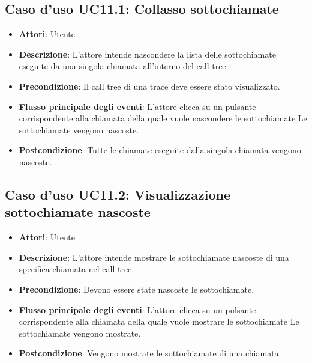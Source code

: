 \subsection{Caso d'uso UC11.1: Collasso sottochiamate}
\begin{itemize}
	\item \textbf{Attori}: Utente
	\item \textbf{Descrizione}: L'attore intende nascondere la lista delle sottochiamate eseguite da una singola chiamata all'interno del call tree.
	\item \textbf{Precondizione}: Il call tree di una trace deve essere stato visualizzato.
	\item \textbf{Flusso principale degli eventi}: L'attore clicca su un pulsante corrispondente alla chiamata della quale vuole nascondere le sottochiamate Le sottochiamate vengono nascoste.
	\item \textbf{Postcondizione}: Tutte le chiamate eseguite dalla singola chiamata vengono nascoste.
\end{itemize}
\subsection{Caso d'uso UC11.2: Visualizzazione sottochiamate nascoste}
\begin{itemize}
	\item \textbf{Attori}: Utente
	\item \textbf{Descrizione}: L'attore intende mostrare le sottochiamate nascoste di una specifica chiamata nel call tree.
	\item \textbf{Precondizione}: Devono essere state nascoste le sottochiamate.
	\item \textbf{Flusso principale degli eventi}: L'attore clicca su un pulsante corrispondente alla chiamata della quale vuole mostrare le sottochiamate Le sottochiamate vengono mostrate.
	\item \textbf{Postcondizione}: Vengono mostrate le sottochiamate di una chiamata.
\end{itemize}
